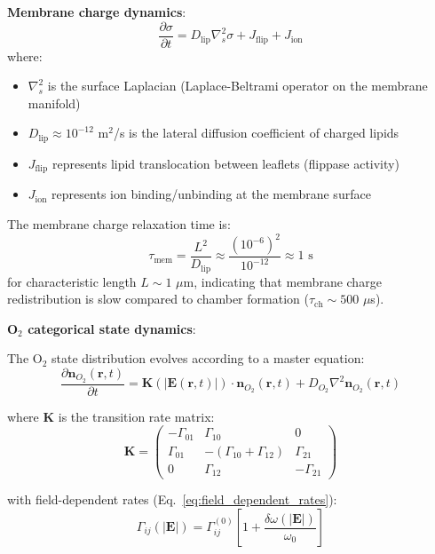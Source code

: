 \documentclass[twocolumn,10pt,aps,prd,superscriptaddress,floatfix,nofootinbib]{revtex4-2}
\theoremstyle{remark}
\begin{document}
\textbf{Membrane charge dynamics}:
\begin{equation}
\frac{\partial\sigma}{\partial t} = D_{\mathrm{lip}}\nabla_s^2\sigma + J_{\mathrm{flip}} + J_{\mathrm{ion}}
\label{eq:membrane_dynamics}
\end{equation}
where:
\begin{itemize}
\item $\nabla_s^2$ is the surface Laplacian (Laplace-Beltrami operator on the membrane manifold)
\item $D_{\mathrm{lip}} \approx 10^{-12}$ m$^2$/s is the lateral diffusion coefficient of charged lipids
\item $J_{\mathrm{flip}}$ represents lipid translocation between leaflets (flippase activity)
\item $J_{\mathrm{ion}}$ represents ion binding/unbinding at the membrane surface
\end{itemize}

The membrane charge relaxation time is:
\begin{equation}
\tau_{\mathrm{mem}} = \frac{L^2}{D_{\mathrm{lip}}} \approx \frac{(10^{-6})^2}{10^{-12}} \approx 1 \text{ s}
\label{eq:membrane_time}
\end{equation}
for characteristic length $L \sim 1$ $\mu$m, indicating that membrane charge redistribution is slow compared to chamber formation ($\tau_{\mathrm{ch}} \sim 500$ $\mu$s).

\textbf{O$_2$ categorical state dynamics}:

The O$_2$ state distribution evolves according to a master equation:
\begin{equation}
\frac{\partial \mathbf{n}_{O_2}(\mathbf{r}, t)}{\partial t} = \mathbf{K}(|\mathbf{E}(\mathbf{r}, t)|) \cdot \mathbf{n}_{O_2}(\mathbf{r}, t) + D_{O_2}\nabla^2\mathbf{n}_{O_2}(\mathbf{r}, t)
\label{eq:O2_master}
\end{equation}

where $\mathbf{K}$ is the transition rate matrix:
\begin{equation}
\mathbf{K} = \begin{pmatrix}
-\Gamma_{01} & \Gamma_{10} & 0 \\
\Gamma_{01} & -(\Gamma_{10} + \Gamma_{12}) & \Gamma_{21} \\
0 & \Gamma_{12} & -\Gamma_{21}
\end{pmatrix}
\label{eq:transition_matrix}
\end{equation}

with field-dependent rates (Eq.~\ref{eq:field_dependent_rates}):
\begin{equation}
\Gamma_{ij}(|\mathbf{E}|) = \Gamma_{ij}^{(0)} \left[1 + \frac{\delta\omega(|\mathbf{E}|)}{\omega_0}\right]
\end{equation}
\end{document}
